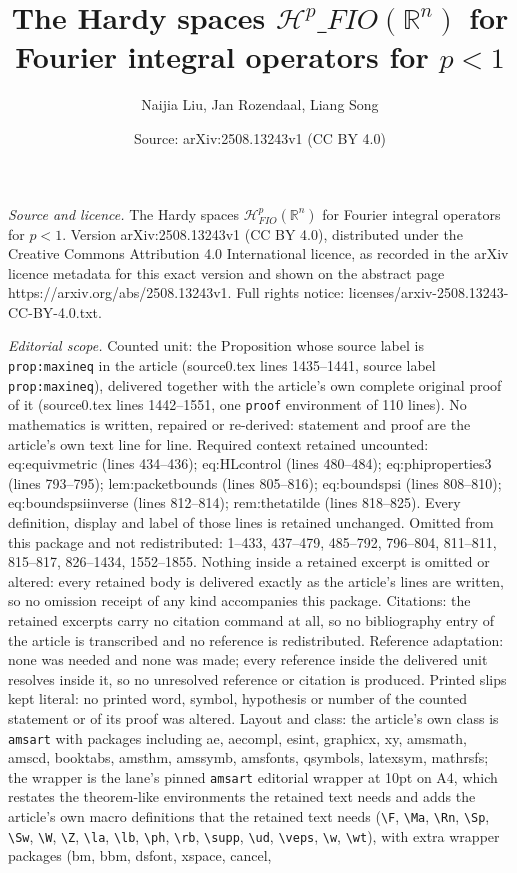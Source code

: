 \documentclass[10pt,a4paper]{amsart}
\title[The Hardy spaces $\mathcal{H}^{p}\_{FIO}(\mathbb{R}^{n})$ for]{The Hardy spaces $\mathcal{H}^{p}\_{FIO}(\mathbb{R}^{n})$ for Fourier integral operators for $p<1$}
\author{Naijia Liu, Jan Rozendaal, Liang Song}
\date{Source: arXiv:2508.13243v1 (CC BY 4.0)}
\begin{document}
\maketitle

\noindent\emph{Source and licence.} The Hardy spaces $\mathcal{H}^{p}_{FIO}(\mathbb{R}^{n})$ for Fourier integral operators for $p<1$. Version arXiv:2508.13243v1 (CC BY 4.0), distributed under the Creative Commons Attribution 4.0 International licence, as recorded in the arXiv licence metadata for this exact version and shown on the abstract page https://arxiv.org/abs/2508.13243v1. Full rights notice: licenses/arxiv-2508.13243-CC-BY-4.0.txt.\par\smallskip

\noindent\textit{Editorial scope.} Counted unit: the Proposition whose source label is \texttt{prop:maxineq} in the article (source0.tex lines 1435--1441, source label \texttt{prop:maxineq}), delivered together with the article's own complete original proof of it (source0.tex lines 1442--1551, one \texttt{proof} environment of 110 lines). No mathematics is written, repaired or re-derived: statement and proof are the article's own text line for line. Required context retained uncounted: eq:equivmetric (lines 434--436); eq:HLcontrol (lines 480--484); eq:phiproperties3 (lines 793--795); lem:packetbounds (lines 805--816); eq:boundspsi (lines 808--810); eq:boundspsiinverse (lines 812--814); rem:thetatilde (lines 818--825). Every definition, display and label of those lines is retained unchanged. Omitted from this package and not redistributed: 1--433, 437--479, 485--792, 796--804, 811--811, 815--817, 826--1434, 1552--1855. Nothing inside a retained excerpt is omitted or altered: every retained body is delivered exactly as the article's lines are written, so no omission receipt of any kind accompanies this package. Citations: the retained excerpts carry no citation command at all, so no bibliography entry of the article is transcribed and no reference is redistributed. Reference adaptation: none was needed and none was made; every reference inside the delivered unit resolves inside it, so no unresolved reference or citation is produced. Printed slips kept literal: no printed word, symbol, hypothesis or number of the counted statement or of its proof was altered. Layout and class: the article's own class is \texttt{amsart} with packages including ae, aecompl, esint, graphicx, xy, amsmath, amscd, booktabs, amsthm, amssymb, amsfonts, qsymbols, latexsym, mathrsfs; the wrapper is the lane's pinned \texttt{amsart} editorial wrapper at 10pt on A4, which restates the theorem-like environments the retained text needs and adds the article's own macro definitions that the retained text needs (\texttt{\textbackslash F}, \texttt{\textbackslash Ma}, \texttt{\textbackslash Rn}, \texttt{\textbackslash Sp}, \texttt{\textbackslash Sw}, \texttt{\textbackslash W}, \texttt{\textbackslash Z}, \texttt{\textbackslash la}, \texttt{\textbackslash lb}, \texttt{\textbackslash ph}, \texttt{\textbackslash rb}, \texttt{\textbackslash supp}, \texttt{\textbackslash ud}, \texttt{\textbackslash veps}, \texttt{\textbackslash w}, \texttt{\textbackslash wt}), with extra wrapper packages (bm, bbm, dsfont, xspace, cancel, 
\end{document}
